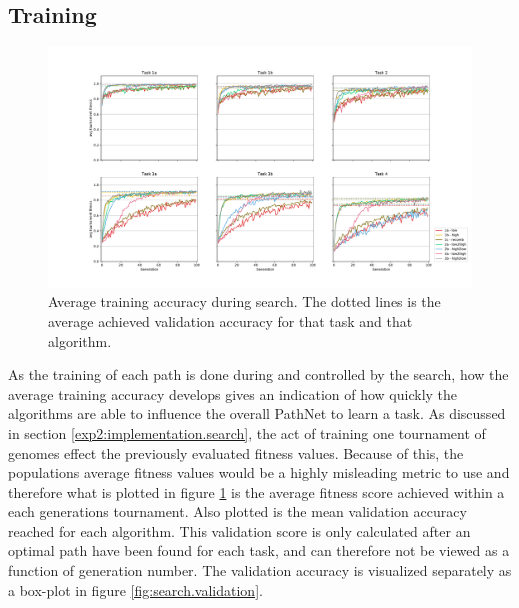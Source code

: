 \subsection{Training}

\begin{figure}
    \includegraphics[width=1.2\textwidth,center]{Chapters/4.Experiments/exp2/figures/large/Training_accuracy.pdf}
    \caption{Average training accuracy during search. The dotted lines is the average achieved validation accuracy for that task and that algorithm.}
    \label{fig:search.accuracy}
\end{figure}

As the training of each path is done during and controlled by the search, how the average training accuracy develops gives an indication of how quickly the algorithms are able to influence the overall PathNet to learn a task. As discussed in section \ref{exp2:implementation.search}, the act of training one tournament of genomes effect the previously evaluated fitness values. Because of this, the populations average fitness values would be a highly misleading metric to use and therefore what is plotted in figure \ref{fig:search.accuracy} is the average fitness score achieved within a each generations tournament. Also plotted is the mean validation accuracy reached for each algorithm. This validation score is only calculated after an optimal path have been found for each task, and can therefore not be viewed as a function of generation number. The validation accuracy is visualized separately as a box-plot in figure \ref{fig:search.validation}.

